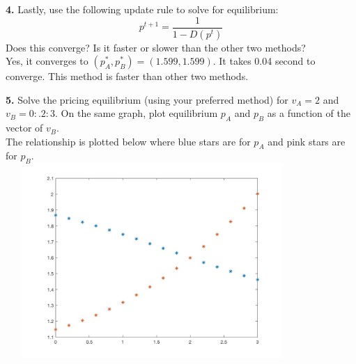 \documentclass[10pt]{article}
\begin{document}
\vspace{2em}
\noindent
\textbf{4.}
Lastly, use the following update rule to solve for equilibrium:
\begin{equation}
	p^{t+1} = \frac{1}{1-D(p^t)}
\end{equation}
Does this converge? Is it faster or slower than the other two methods?\\[2em]

Yes, it converges to  $(p^*_A, p^*_B)=(1.599, 1.599)$. It takes 0.04 second to converge. This method is faster than other two methods.

\vspace{2em}



\noindent
\textbf{5.} Solve the pricing equilibrium (using your preferred method) for $v_A=2$ and $v_B=0:.2:3$. On the same graph, plot equilibrium $p_A$ and $p_B$ as a function of the vector of $v_B$. \\[2em]

The relationship is plotted below where blue stars are for $p_A$ and pink stars are for $p_B$.  \\
\includegraphics[width=30em, height=20em ]{plot.jpg}
\end{document}
